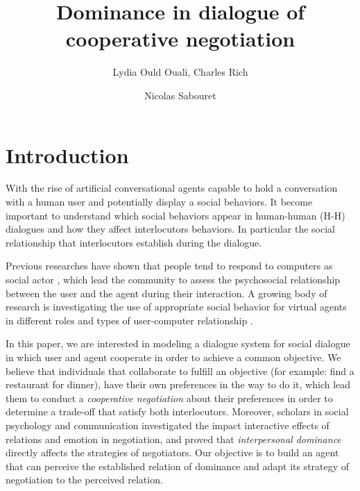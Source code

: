\documentclass{llncs}
\begin{document}
	\title{\vskip -10pt Dominance in dialogue of cooperative negotiation}
	
	\author{Lydia Ould Ouali, Charles Rich \and
		Nicolas Sabouret }
	

	\maketitle
	\section{Introduction}
	With the rise of artificial conversational agents capable to hold a conversation with a human user and potentially display a social behaviors. It become important to understand which social behaviors appear in human-human (H-H) dialogues and how they affect interlocutors behaviors. In particular the social relationship that interlocutors establish during the dialogue.
	
	Previous researches have shown that people tend to respond to computers as social actor \cite{bickmore2005establishing}, which lead the community to assess the psychosocial relationship between the user and the agent during their interaction. 
	A growing body of research is investigating the use of appropriate social behavior for virtual agents in different roles and types of user-computer relationship \cite{bickmore2005s,bickmore2005establishing,kidd2005sociable}.

	
	In this paper, we are interested in modeling a dialogue system for social dialogue in which user and agent cooperate in order to achieve a common objective.  We believe that individuals that collaborate to fulfill an objective (for example: find a restaurant for dinner), have their own preferences in the way to do it, which lead them to conduct a \emph{cooperative negotiation} about their preferences in order to determine a trade-off that satisfy both interlocutors. Moreover, scholars in social psychology and communication investigated \cite{dunbar2005perceptions,de1995impact} the impact interactive effects of relations and emotion in negotiation, and proved that  \emph{interpersonal dominance} directly affects the strategies of negotiators. Our objective is to build an agent that can perceive the established relation of dominance and adapt its strategy of negotiation to the perceived relation. 
	
\end{document}
